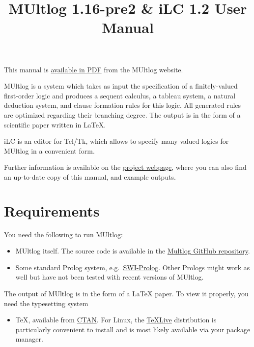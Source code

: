 \documentclass[
]{article}
\title{MUltlog 1.16-pre2 \& iLC 1.2 User Manual}
\author{}
\date{}
\providecommand{\tightlist}{%
  \setlength{\itemsep}{0pt}\setlength{\parskip}{0pt}}
\begin{document}
\maketitle

{
\setcounter{tocdepth}{2}
\tableofcontents
}
This manual is \href{https://logic.at/multlog/multlog.pdf}{available in
PDF} from the MUltlog website.

MUltlog is a system which takes as input the specification of a
finitely-valued first-order logic and produces a sequent calculus, a
tableau system, a natural deduction system, and clause formation rules
for this logic. All generated rules are optimized regarding their
branching degree. The output is in the form of a scientific paper
written in LaTeX.

iLC is an editor for Tcl/Tk, which allows to specify many-valued logics
for MUltlog in a convenient form.

Further information is available on the
\href{http://www.logic.at/multlog/}{project webpage}, where you can also
find an up-to-date copy of this manual, and example outputs.

\hypertarget{requirements}{%
\section{Requirements}\label{requirements}}

You need the following to run MUltlog:

\begin{itemize}
\item
  MUltlog itself. The source code is available in the
  \href{https://github.com/rzach/multlog}{Multlog GitHub repository}.
\item
  Some standard Prolog system,
  e.g.~\href{https://www.swi-prolog.org/}{SWI-Prolog}. Other Prologs
  might work as well but have not been tested with recent versions of
  MUltlog.
\end{itemize}

The output of MUltlog is in the form of a LaTeX paper. To view it
properly, you need the typesetting system

\begin{itemize}
\tightlist
\item
  TeX, available from \href{https://ctan.org/}{CTAN}. For Linux, the
  \href{https://www.tug.org/texlive/}{TeXLive} distribution is
  particularly convenient to install and is most likely available via
  your package manager.
\end{itemize}
\end{document}
